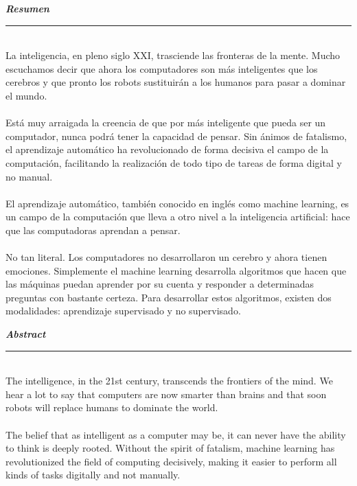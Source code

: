 \documentclass[11pt,a4paper]{article}
\begin{document}
		\textbf{\textit{\large Resumen}}\rule[1.5mm]{5mm}{0.1mm}	\vspace{\baselineskip}
		
		\\La inteligencia, en pleno siglo XXI, trasciende las fronteras de la mente. Mucho escuchamos decir que ahora los computadores son más inteligentes que los cerebros y que pronto los robots sustituirán a los humanos para pasar a dominar el mundo.\\
		
        \\Está muy arraigada la creencia de que por más inteligente que pueda ser un computador, nunca podrá tener la capacidad de pensar. Sin ánimos de fatalismo, el aprendizaje automático ha revolucionado de forma decisiva el campo de la computación, facilitando la realización de todo tipo de tareas de forma digital y no manual.\\ 
        
        \\El aprendizaje automático, también conocido en inglés como machine learning, es un campo de la computación que lleva a otro nivel a la inteligencia artificial: hace que las computadoras aprendan a pensar.\\
        
        \\No tan literal. Los computadores no desarrollaron un cerebro y ahora tienen emociones. Simplemente el machine learning desarrolla algoritmos que hacen que las máquinas puedan aprender por su cuenta y responder a determinadas preguntas con bastante certeza. Para desarrollar estos algoritmos, existen dos modalidades: aprendizaje supervisado y no supervisado.\\
		
		\newpage
		
		\textbf{\textit{\large Abstract}}\rule[1.5mm]{5mm}{0.1mm} 		
		\textit{	
		 }\vspace{\baselineskip}
		 \\The intelligence, in the 21st century, transcends the frontiers of the mind. We hear a lot to say that computers are now smarter than brains and that soon robots will replace humans to dominate the world.\\
		 
		 \\The belief that as intelligent as a computer may be, it can never have the ability to think is deeply rooted. Without the spirit of fatalism, machine learning has revolutionized the field of computing decisively, making it easier to perform all kinds of tasks digitally and not manually.\\
		 
\end{document}
